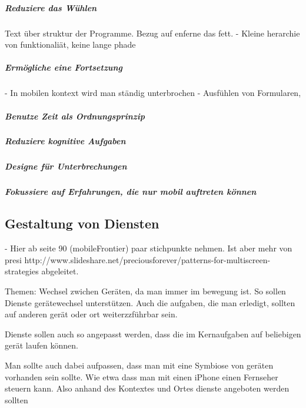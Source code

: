 \subparagraph{Reduziere das Wühlen} %
\label{subp:reduziere_das_w_hlen}
Text über struktur der Programme. Bezug auf enferne das fett.
- Kleine herarchie von funktionaliät, keine lange phade

\subparagraph{Ermögliche eine Fortsetzung} %
\label{subp:erm_gliche_eine_fortsetzung}

- In mobilen kontext wird man ständig unterbrochen
- Ausfühlen von Formularen, 



\subparagraph{Benutze Zeit als Ordnungsprinzip} %
\label{subp:benutze_zeit_als_ordnungsprinzip}

\subparagraph{Reduziere kognitive Aufgaben } %
\label{subp:reduziere_kognitive_aufgaben_}

\subparagraph{Designe für Unterbrechungen} %
\label{subp:designe_f_r_unterbrechungen}

\subparagraph{Fokussiere auf Erfahrungen, die nur mobil auftreten können} %
\label{subp:fokussiere_auf_erfahrungen_die_nur_mobil_auftreten_k_nnen}



\subsection{Gestaltung von Diensten} %
\label{sub:gestaltung_von_diensten}

- Hier ab seite 90 (mobileFrontier) paar stichpunkte nehmen. Ist aber mehr von presi http://www.slideshare.net/preciousforever/patterns-for-multiscreen-strategies abgeleitet. 

Themen: Wechsel zwichen Geräten, da man immer im bewegung ist. So sollen Dienste gerätewechsel unterstützen. Auch die aufgaben, die man erledigt, sollten auf anderen gerät oder ort weiterzzführbar sein.

Dienste sollen auch so angepasst werden, dass die im Kernaufgaben auf beliebigen gerät laufen können.

Man sollte auch dabei aufpassen, dass man mit eine Symbiose von geräten vorhanden sein sollte. Wie etwa dass man mit einen iPhone einen Fernseher steuern kann. Also anhand des Kontextes und Ortes dienste angeboten werden sollten

